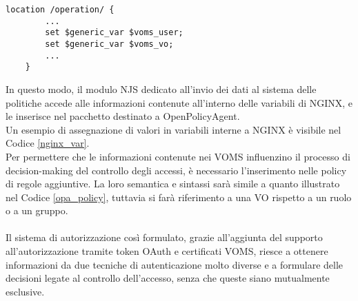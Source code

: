 \begin{lstlisting}[caption={[Assegnazione di variabili in NGINX] Assegnazione di valore alle variabili in NGINX, tramite la keyword \texttt{set}.},captionpos=b,label=nginx_var]
    location /operation/ {
        ...
        set $generic_var $voms_user;
        set $generic_var $voms_vo;
        ...
    }
\end{lstlisting}
In questo modo, il modulo NJS 
dedicato all'invio dei dati al sistema delle politiche accede alle informazioni 
contenute all'interno delle variabili di NGINX, 
e le inserisce nel pacchetto destinato a OpenPolicyAgent. 
\\Un esempio di assegnazione di valori in variabili interne a 
NGINX è visibile nel Codice \ref{nginx_var}.
\\ Per permettere che le informazioni contenute nei VOMS influenzino il processo di decision-making del controllo degli accessi,
 è necessario l'inserimento nelle policy di regole aggiuntive. La loro semantica e sintassi sarà simile a quanto illustrato nel Codice \ref*{opa_policy},
tuttavia si farà riferimento a una VO rispetto a un ruolo o a un gruppo.
\\ \\ Il sistema di autorizzazione così formulato, grazie all'aggiunta del supporto all'autorizzazione tramite token OAuth e certificati VOMS, riesce a ottenere informazioni 
da due tecniche di autenticazione molto diverse e a formulare delle decisioni legate al controllo dell'accesso, senza che queste siano mutualmente esclusive. 

